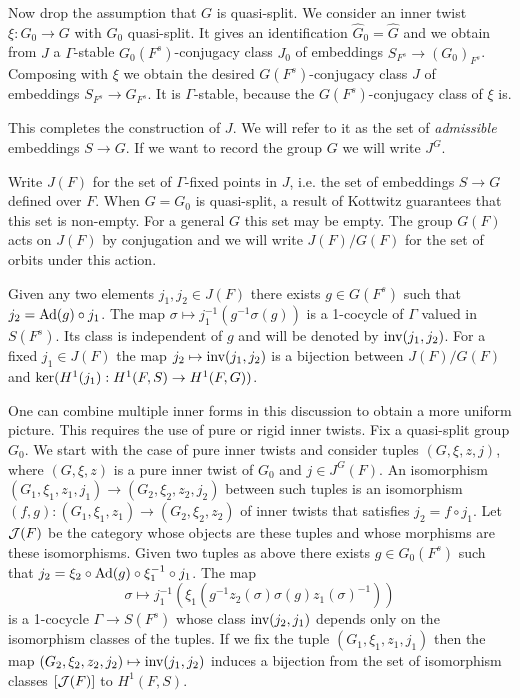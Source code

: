 \documentclass{article}
\theoremstyle{definition}
\numberwithin{equation}{section}
\renewcommand{\-}{\hyp{}}
\begin{document}
Now drop the assumption that $G$ is quasi-split. We consider an inner twist $\xi : G_0 \to G$ with $G_0$ quasi-split. It gives an identification $\hat G_0=\hat G$ and we obtain from $\hat J$ a $\Gamma$-stable $G_0(F^s)$-conjugacy class $J_0$ of embeddings $S_{F^s} \to (G_0)_{F^s}$. Composing with $\xi$ we obtain the desired $G(F^s)$-conjugacy class $J$ of embeddings $S_{F^s} \to G_{F^s}$. It is $\Gamma$-stable, because the $G(F^s)$-conjugacy class of $\xi$ is.

This completes the construction of $J$. We will refer to it as the set of \emph{admissible} embeddings $S \to G$. If we want to record the group $G$ we will write $J^G$.

Write $J(F)$ for the set of $\Gamma$-fixed points in $J$, i.e. the set of embeddings $S \to G$ defined over $F$. When $G=G_0$ is quasi-split, a result of Kottwitz \cite[Corollary 2.2]{Kot82} guarantees that this set is non-empty. For a general $G$ this set may be empty. The group $G(F)$ acts on $J(F)$ by conjugation and we will write $J(F)/G(F)$ for the set of orbits under this action.

Given any two elements $j_1,j_2 \in J(F)$ there exists $g \in G(F^s)$ such that $j_2 = \textrm{Ad}(g)\circ j_1$. The map $\sigma \mapsto j_1^{-1}(g^{-1}\sigma(g))$ is a 1-cocycle of $\Gamma$ valued in $S(F^s)$. Its class is independent of $g$ and will be denoted by $\textrm{inv}(j_1,j_2)$. For a fixed $j_1 \in J(F)$ the map $j_2 \mapsto \textrm{inv}(j_1,j_2)$ is a bijection between $J(F)/G(F)$ and $\textrm{ker}(H^1(j_1) : H^1(F,S) \to H^1(F,G))$.

One can combine multiple inner forms in this discussion to obtain a more uniform picture. This requires the use of pure or rigid inner twists. Fix a quasi-split group $G_0$. We start with the case of pure inner twists and consider tuples $(G,\xi,z,j)$, where $(G,\xi,z)$ is a pure inner twist of $G_0$ and $j \in J^G(F)$. An isomorphism $(G_1,\xi_1,z_1,j_1) \to (G_2,\xi_2,z_2,j_2)$ between such tuples is an isomorphism $(f,g) : (G_1,\xi_1,z_1) \to (G_2,\xi_2,z_2)$ of inner twists that satisfies $j_2=f\circ j_1$. Let $\mathcal{J}(F)$ be the category whose objects are these tuples and whose morphisms are these isomorphisms. Given two tuples as above there exists $g \in G_0(F^s)$ such that $j_2 = \xi_2 \circ \textrm{Ad}(g)\circ\xi_1^{-1}\circ j_1$. The map 
\[ \sigma \mapsto j_1^{-1}(\xi_1(g^{-1}z_2(\sigma)\sigma(g)z_1(\sigma)^{-1})) \] 
is a 1-cocycle $\Gamma \to S(F^s)$ whose class $\textrm{inv}(j_2,j_1)$ depends only on the isomorphism classes of the tuples. If we fix the tuple $(G_1,\xi_1,z_1,j_1)$ then the map $(G_2,\xi_2,z_2,j_2) \mapsto \textrm{inv}(j_1,j_2)$ induces a bijection from the set of isomorphism classes $[\mathcal{J}(F)]$ to $H^1(F,S)$.
\end{document}
